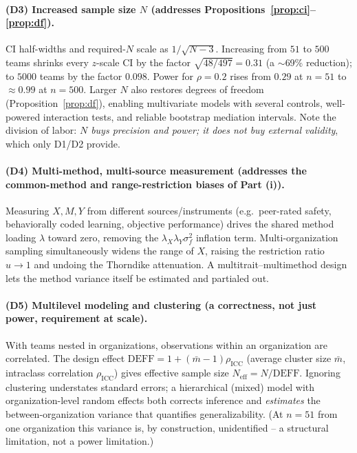\documentclass{amsart}
\theoremstyle{definition}
\begin{document}
\paragraph{(D3) Increased sample size $N$ (addresses
Propositions~\ref{prop:ci}--\ref{prop:df}).}
CI half-widths and required-$N$ scale as $1/\sqrt{N-3}$. Increasing
from $51$ to $500$ teams shrinks every $z$-scale CI by the factor
$\sqrt{48/497}=0.31$ (a $\sim$69\% reduction); to $5000$ teams by the factor
$0.098$. Power for $\rho=0.2$ rises from $0.29$ at $n=51$ to $\approx0.99$ at
$n=500$. Larger $N$ also restores degrees of freedom
(Proposition~\ref{prop:df}), enabling multivariate models with several
controls, well-powered interaction tests, and reliable bootstrap mediation
intervals. Note the division of labor: \emph{$N$ buys precision and power;
it does not buy external validity}, which only D1/D2 provide.

\paragraph{(D4) Multi-method, multi-source measurement (addresses the
common-method and range-restriction biases of Part (i)).}
Measuring $X,M,Y$ from different sources/instruments (e.g.\ peer-rated safety,
behaviorally coded learning, objective performance) drives the shared method
loading $\lambda$ toward zero, removing the
$\lambda_X\lambda_Y\sigma_f^2$ inflation term. Multi-organization sampling
simultaneously widens the range of $X$, raising the restriction ratio
$u\to1$ and undoing the Thorndike attenuation. A multitrait--multimethod
design lets the method variance itself be estimated and partialed out.

\paragraph{(D5) Multilevel modeling and clustering (a correctness, not just
power, requirement at scale).}
With teams nested in organizations, observations within an organization are
correlated. The design effect $\mathrm{DEFF}=1+(\bar m-1)\rho_{\text{ICC}}$
(average cluster size $\bar m$, intraclass correlation $\rho_{\text{ICC}}$)
gives effective sample size $N_{\text{eff}}=N/\mathrm{DEFF}$. Ignoring
clustering understates standard errors; a hierarchical (mixed) model with
organization-level random effects both corrects inference and \emph{estimates}
the between-organization variance that quantifies generalizability. (At
$n=51$ from one organization this variance is, by construction,
unidentified -- a structural limitation, not a power limitation.)
\end{document}

